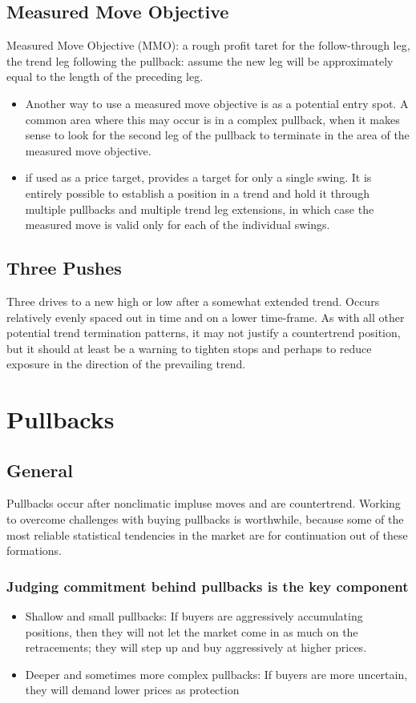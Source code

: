 \documentclass{../notes}
\begin{document}
\subsection{Measured Move Objective}
Measured Move Objective (MMO): a rough profit taret for the follow-through leg, the trend leg following the pullback: assume the new leg will be approximately equal to the length of the preceding leg.
\begin{itemize}
  \item Another way to use a measured move objective is as a potential entry spot. A common area where this may occur is in a complex pullback, when it makes sense to look for the second leg of the pullback to terminate in the area of the measured move objective.
  \item if used as a price target, provides a target for only a single swing. It is entirely possible to establish a position in a trend and hold it through multiple pullbacks and multiple trend leg extensions, in which case the measured move is valid only for each of the individual swings.
\end{itemize}
\subsection{Three Pushes}
Three drives to a new high or low after a somewhat extended trend. Occurs relatively evenly spaced out in time and on a lower time-frame. As with all other potential trend termination patterns, it may not justify a countertrend position, but it should at least be a warning to tighten stops and perhaps to reduce exposure in the direction of the prevailing trend.

\section{Pullbacks}
\subsection{General}
Pullbacks occur after nonclimatic impluse moves and are countertrend. Working to overcome challenges with buying pullbacks is worthwhile, because some of the most reliable statistical tendencies in the market are for continuation out of these formations.
\subsubsection{Judging commitment behind pullbacks is the key component}
\begin{itemize}
  \item Shallow and small pullbacks: If buyers are aggressively accumulating positions, then they will not let the market come in as much on the retracements; they will step up and buy aggressively at higher prices.
  \item Deeper and sometimes more complex pullbacks: If buyers are more uncertain, they will demand lower prices as protection
\end{itemize}
\end{document}
